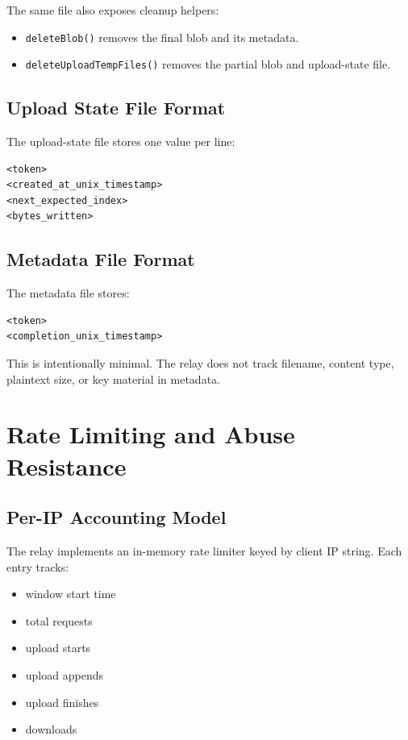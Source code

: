 \documentclass[11pt,a4paper]{report}
\begin{document}
The same file also exposes cleanup helpers:

\begin{itemize}[leftmargin=1.5cm]
    \item \texttt{deleteBlob()} removes the final blob and its metadata.
    \item \texttt{deleteUploadTempFiles()} removes the partial blob and upload-state file.
\end{itemize}

\section{Upload State File Format}

The upload-state file stores one value per line:

\begin{lstlisting}[language={}]
<token>
<created_at_unix_timestamp>
<next_expected_index>
<bytes_written>
\end{lstlisting}

\section{Metadata File Format}

The metadata file stores:

\begin{lstlisting}[language={}]
<token>
<completion_unix_timestamp>
\end{lstlisting}

This is intentionally minimal. The relay does not track filename, content type, plaintext size, or key material in metadata.

\chapter{Rate Limiting and Abuse Resistance}

\section{Per-IP Accounting Model}

The relay implements an in-memory rate limiter keyed by client IP string. Each entry tracks:

\begin{itemize}[leftmargin=1.5cm]
    \item window start time
    \item total requests
    \item upload starts
    \item upload appends
    \item upload finishes
    \item downloads
\end{itemize}
\end{document}
